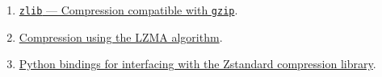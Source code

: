 \begin{enumerate}
\item \href{https://docs.python.org/3/library/zlib.html}{\texttt{zlib} — Compression compatible with \texttt{gzip}}.
\item \href{https://docs.python.org/3/library/lzma.html}{Compression using the LZMA algorithm}.
\item \href{https://pypi.org/project/zstandard/}{Python bindings for interfacing with the Zstandard compression library}.
\end{enumerate}



